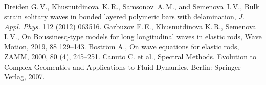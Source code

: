 \documentclass[12pt, a4paper]{article}
\begin{document}
\begin{thebibliography}{99}
	 Dreiden G.\,V., Khusnutdinova~K.\,R., Samsonov~A.\,M., and Semenova~I.\,V., Bulk strain solitary waves in bonded layered polymeric bars with delamination, \textit{J. Appl. Phys.} 112 (2012) 063516.
	 Garbuzov F.\,E., Khusnutdinova K.\,R., Semenova I.\,V., On Boussinesq-type models for long longitudinal waves in elastic rods, Wave Motion, 2019, 88 129--143.
	 Bostr\"{o}m A., On wave equations for elastic rods, ZAMM, 2000, 80 (4), 245--251. 
	 Canuto C. et al., Spectral Methods. Evolution to Complex Geomenties and Applications to Fluid Dynamics, Berlin: Springer-Verlag, 2007.
\end{thebibliography}
\end{document}
